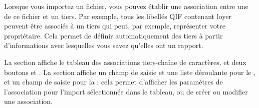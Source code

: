 \ifIllustration
\pichskip{8mm}
\label{setup-importLinks-img}
\fi
\noindent Lorsque vous importez un fichier, vous pouvez établir une association entre une  de ce fichier et un tiers. Par exemple, tous les libellés \gls{QIF} contenant \newlinepdf \og loyer \fg{} peuvent être associés à un tiers qui peut, par exemple, représenter votre propriétaire. Cela permet de définir automatiquement des tiers à partir d'informations avec lesquelles vous savez qu'elles ont un rapport.

\ifIllustration
\fi

La section  affiche le tableau des associations tiers-chaîne de caractères, et deux boutons  et . La section  affiche un champ de saisie et une liste déroulante pour le , et un champ de saisie pour la  : cela permet d'afficher les paramètres de l'association pour l'import sélectionnée dans le tableau, ou de créer ou modifier une association.

\ifIllustration
\fi

